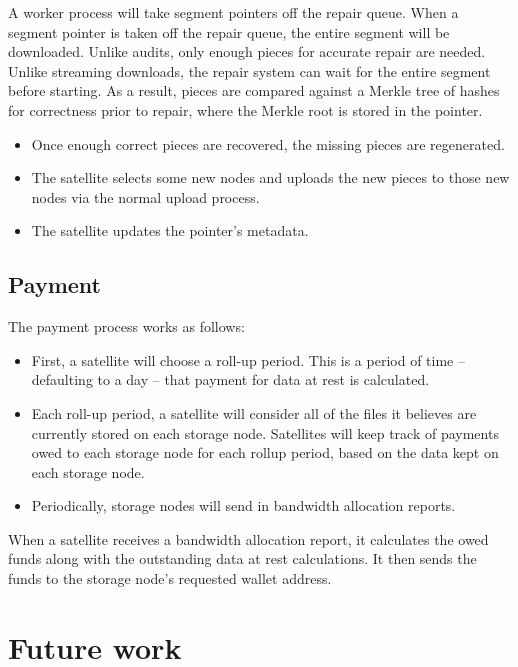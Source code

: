 \documentclass[11pt,fleqn,openany]{book}
\begin{document}
A worker process will take segment pointers off the repair queue. When
  a segment pointer is taken off the repair queue, the entire segment will be
  downloaded. Unlike audits, only enough pieces for accurate repair are needed.
  Unlike streaming downloads, the repair system can wait for the entire segment
  before starting. As a result, pieces are compared against a Merkle tree of
  hashes for correctness prior to repair, where the Merkle root is stored in
  the pointer.

\begin{itemize}
\item Once enough correct pieces are recovered, the missing pieces are
  regenerated.
\item The satellite selects some new nodes and uploads the new pieces to
  those new nodes via the normal upload process.
\item The satellite updates the pointer's metadata.
\end{itemize}

\section{Payment}

The payment process works as follows:

\begin{itemize}
\item First, a satellite will choose a roll-up period. This is a period of
  time -- defaulting to a day -- that payment for data at rest is calculated.
\item Each roll-up period, a satellite will consider all of the files it
  believes are currently stored on each storage node. Satellites will keep track
of payments owed to each storage node for each rollup period, based on
the data kept on each storage node.
\item Periodically, storage nodes will send in bandwidth allocation reports.
\end{itemize}

When a
  satellite receives a bandwidth allocation report, it calculates the owed
  funds along with the outstanding data at rest calculations. It then sends the
  funds to the storage node's requested wallet address.

\chapter{Future work}\label{chap:future-work}
\end{document}

